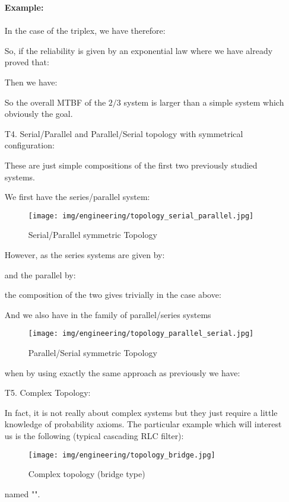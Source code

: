 \begin{enumerate}
		\begin{tcolorbox}[colframe=black,colback=white,sharp corners]
		\textbf{{\Large {}}Example:}\\\\
		In the case of the triplex, we have therefore:
		
		So, if the reliability is given by an exponential law where we have already proved that:
		
		Then we have:
		
		So the overall MTBF of the $2/3$ system is larger than a simple system which obviously the goal.
		\end{tcolorbox}
		
		\pagebreak
		\item[T4.] Serial/Parallel and Parallel/Serial topology with symmetrical configuration:
		
		These are just simple compositions of the first two previously studied systems.
		
		We first have the series/parallel system:
		\begin{figure}[H]
			\begin{center}
				\texttt{[image: img/engineering/topology\_serial\_parallel.jpg]}
			\end{center}	
			\caption{Serial/Parallel symmetric Topology}
		\end{figure}
		However, as the series systems are given by:
		
		and the parallel by:
		
		the composition of the two gives trivially in the case above:
		
		And we also have in the family of parallel/series systems
		\begin{figure}[H]
			\begin{center}
				\texttt{[image: img/engineering/topology\_parallel\_serial.jpg]}
			\end{center}	
			\caption{Parallel/Serial symmetric Topology}
		\end{figure}
		when by using exactly the same approach as previously we have:
		
		
		\item[T5.] Complex Topology:
		
		In fact, it is not really about complex systems but they just require a little knowledge of probability axioms. The particular example which will interest us is the following (typical cascading RLC filter):
		\begin{figure}[H]
			\begin{center}
				\texttt{[image: img/engineering/topology\_bridge.jpg]}
			\end{center}	
			\caption{Complex topology (bridge type)}
		\end{figure}
		named "".
		

\end{enumerate}
